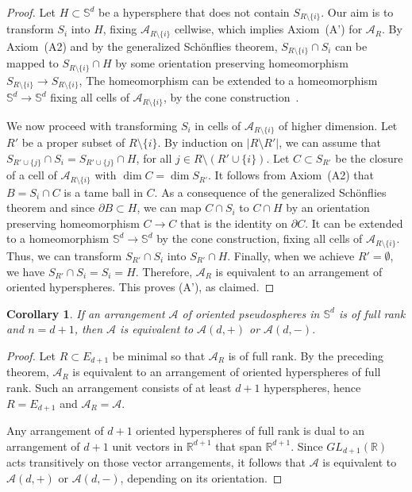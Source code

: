 \documentclass[a4paper]{amsart}
\newcommand{\p}{\mathbb S}
\renewcommand{\d}{\partial}
\newtheorem{corollary}{Corollary}
\theoremstyle{definition}
\theoremstyle{remark}
\begin{document}
\begin{proof}
   Let $H\subset \p^d$ be a hypersphere that does not contain 
  $S_{R\setminus\{i\}}$. Our aim is to transform $S_i$ into $H$, fixing
  $\mathcal A_{R\setminus\{i\}}$ cellwise, which implies Axiom~(A') for
  $\mathcal A_R$.
%
  By Axiom~(A2) and by the generalized Sch\"onflies theorem,
  $S_{R\setminus \{i\}}\cap
  S_i$ can be mapped to $S_{R\setminus\{i\}}\cap H$ by some orientation
  preserving homeomorphism $S_{R\setminus\{i\}}\to S_{R\setminus \{i\}}$,
  The homeomorphism can be extended to a homeomorphism $\p^d\to\p^d$
  fixing all cells of $\mathcal A_{R\setminus\{i\}}$, by
  the cone construction~\cite{stoeckerzieschang}. 

  We now proceed with transforming $S_i$ in cells of $\mathcal
  A_{R\setminus\{i\}}$ of  higher dimension. 
  Let $R'$ be a proper subset of $R\setminus \{i\}$.  By induction on
  $|R\setminus R'|$, we can assume that 
  $S_{R'\cup \{j\}}\cap S_i = S_{R'\cup\{j\}}\cap H$, for all $j\in
  R\setminus (R'\cup \{i\})$.
%
  Let $C\subset S_{R'}$ be the closure of a cell of $\mathcal
  A_{R\setminus \{i\}}$ with $\dim C = \dim S_{R'}$.  It follows from
  Axiom~(A2) that $B=S_i\cap C$ is a tame ball in $C$. 
  As a consequence of the generalized Sch\"onflies
  theorem and since $\d B\subset H$, we can map $C\cap S_i$ to $C\cap H$
  by an orientation preserving homeomorphism $C\to C$ that is the
  identity on $\d C$. It can be extended to a homeomorphism $\p^d\to
  \p^d$ by the cone construction, fixing all cells of $\mathcal
  A_{R\setminus \{i\}}$. 
  Thus, we can transform $S_{R'}\cap S_i$ into $S_{R'}\cap 
  H$. 
  Finally, when we achieve $R'=\emptyset$, we have $S_{R'}\cap S_i = S_i
  = H$.
%
  Therefore, $\mathcal A_{R}$ is equivalent to an arrangement
  of oriented hyperspheres. This proves (A'), as claimed.
\end{proof}

\begin{corollary}\label{cor:n=d+1}
  If an arrangement $\mathcal A$ of oriented pseudospheres in $\p^{d}$ is
  of full rank and $n=d+1$, then $\mathcal A$ 
  is equivalent to $\mathcal A(d,+)$ or $\mathcal A(d,-)$.
\end{corollary}
\begin{proof}
  Let $R\subset E_{d+1}$ be minimal so that $\mathcal A_R$ is of full
  rank. 
  By the preceding theorem, $\mathcal A_R$ is equivalent to
  an arrangement  of oriented hyperspheres of full rank. Such an
  arrangement consists of at least $d+1$ hyperspheres, hence
  $R=E_{d+1}$ and $\mathcal A_R=\mathcal A$.

  Any  arrangement of $d+1$ oriented hyperspheres of full rank is dual to an
  arrangement of $d+1$ unit vectors  in $\mathbb R^{d+1}$ that span
  $\mathbb R^{d+1}$. 
  Since $GL_{d+1}(\mathbb R)$ acts transitively on those vector
  arrangements, it follows that $\mathcal A$ is equivalent to  $\mathcal
  A(d,+)$ or $\mathcal A(d,-)$, depending on its orientation.  
\end{proof}
\end{document}
